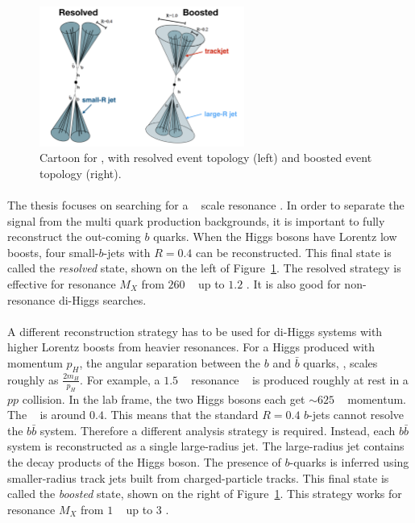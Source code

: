 \begin{figure}[h!]
  \centering
  \includegraphics[width=0.6\textwidth]{figures/theory/resolved_boosted}
  \caption{Cartoon for \Xtohhb, with resolved event topology (left) and boosted event topology (right).}
  \label{fig:resolved_bosted}
\end{figure}

\paragraph{}
The thesis focuses on searching for a \TeV~ scale resonance \Xtohhb. 
In order to separate the signal from the multi quark production backgrounds, it is important to fully reconstruct the out-coming $b$ quarks.
When the Higgs bosons have Lorentz low boosts, four small-\R $b$-jets with $R=0.4$ can be reconstructed.
This final state is called the \textit{resolved} state, shown on the left of Figure~\ref{fig:resolved_bosted}.
The resolved strategy is effective for resonance $M_X$ from $260$ \GeV~ up to $1.2$ \TeV.
It is also good for non-resonance di-Higgs searches.

\paragraph{}
A different reconstruction strategy has to be used for di-Higgs systems with higher Lorentz boosts from heavier resonances.
For a Higgs produced with momentum $p_{H}$, the angular separation between the $b$ and $\bar{b}$ quarks, \drbb, scales roughly as $\frac{2m_H}{p_{H}}$. 
For example, a $1.5$ \TeV~ resonance \Grav~ is produced roughly at rest in a $pp$ collision. 
In the lab frame, the two Higgs bosons each get $\sim 625$ \GeV~ momentum. 
The \drbb~ is around $0.4$.
This means that the standard $R=0.4$ $b$-jets cannot resolve the $b\bar{b}$ system.
Therefore a different analysis strategy is required.
Instead, each $b\bar{b}$ system is reconstructed as a single large-radius jet.
The large-radius jet contains the decay products of the Higgs boson.
The presence of $b$-quarks is inferred using smaller-radius track jets built from charged-particle tracks.
This final state is called the \textit{boosted} state, shown on the right of Figure~\ref{fig:resolved_bosted}.
This strategy works for resonance $M_X$ from $1$ \GeV~ up to $3$ \TeV.


